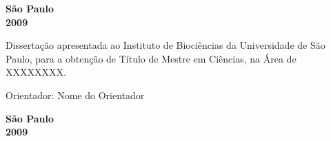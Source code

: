 \begin{titlepage}
\oddsidemargin 1.2cm
\evensidemargin 0cm
\begin{center}
{\LARGE \nomedoaluno}
\par
\vspace{200pt}
{\Huge \tit}
\par
\vspace{280pt}
\textbf{{\large São Paulo}\\
{\large 2009}}
\end{center}
\end{titlepage}
\clearpage{\pagestyle{empty}\cleardoublepage}

\oddsidemargin 1.2cm
\evensidemargin 0cm


\thispagestyle{empty}
\begin{center}
{\LARGE \nomedoaluno}
\par
\vspace{203pt}
{\Huge \tit}
\end{center}

\par
\vspace{90pt}
\hspace*{16em}\parbox{7.6cm}{{\large Dissertação apresentada ao Instituto de Biociências da Universidade de São Paulo, para a obtenção de Título de Mestre em Ciências, na Área de XXXXXXXX.}}

\par
\vspace{1em}
\hspace*{16em}\parbox{7.6cm}{{\large Orientador: Nome do Orientador}}

\par
\vspace{100pt}
\begin{center}
\textbf{{\large São Paulo}\\
{\large 2009}}
\end{center}

\newpage

\thispagestyle{empty}

